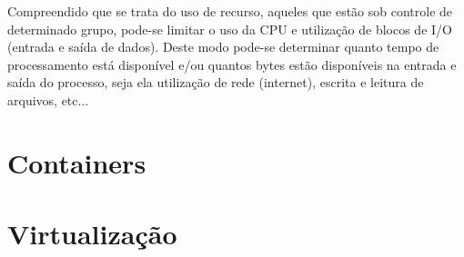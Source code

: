Compreendido que se trata do uso de recurso, aqueles que estão sob controle de determinado grupo, pode-se limitar o uso da CPU e utilização de blocos de I/O (entrada e saída de dados). Deste modo pode-se determinar quanto tempo de processamento está disponível e/ou quantos bytes estão disponíveis na entrada e saída do processo, seja ela utilização de rede (internet), escrita e leitura de arquivos, etc...

\section{Containers}

\section{Virtualização}